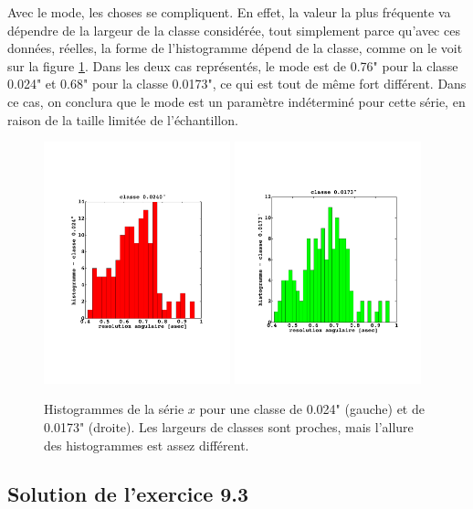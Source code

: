 Avec le mode, les choses se compliquent. En effet, la valeur la plus fréquente va dépendre de  la largeur de la classe considérée, tout simplement parce qu'avec ces données, réelles, la forme de l'histogramme dépend de la classe, comme on le voit sur la figure \ref{fig:exe62}. Dans les deux cas représentés, le mode est de 0.76" pour la classe 0.024" et 0.68" pour la classe 0.0173", ce qui est tout de même fort différent. Dans ce cas, on conclura que le mode est un paramètre indéterminé pour cette série, en raison de la taille limitée de l'échantillon.
\begin{figure}[htb]
   \centering
   \includegraphics[height=7cm]{assets/figures/exe6hist1.pdf}\hspace{7mm}
   \includegraphics[height=7cm]{assets/figures/exe6hist2.pdf}
   \caption{Histogrammes de la série $x$ pour une classe de 0.024" (gauche) et de 0.0173" (droite). Les largeurs de classes sont proches, mais l'allure des histogrammes est assez différent.}
   \label{fig:exe62}
\end{figure}

\subsection*{Solution de l'exercice 9.3}

